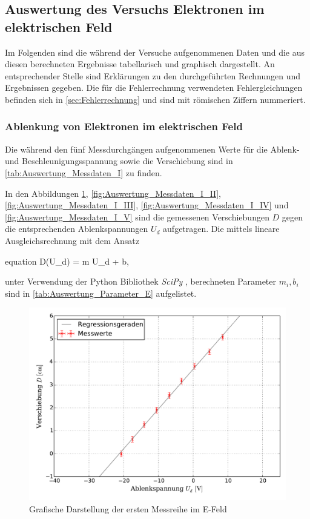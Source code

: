 \subsection{Auswertung des Versuchs Elektronen im elektrischen Feld}
	
	Im Folgenden sind die während der Versuche aufgenommenen Daten
	und die aus diesen berechneten Ergebnisse tabellarisch und graphisch
	dargestellt. An entsprechender Stelle sind Erklärungen zu den 
	durchgeführten Rechnungen und Ergebnissen gegeben.
	Die für die Fehlerrechnung verwendeten Fehlergleichungen befinden 
	sich in \cref{sec:Fehlerrechnung} und sind mit römischen Ziffern nummeriert.

	\subsubsection{Ablenkung von Elektronen im elektrischen Feld}
	
		Die während den fünf Messdurchgängen aufgenommenen Werte für die
		Ablenk- und Beschleunigungsspannung sowie die Verschiebung sind in \cref{tab:Auswertung_Messdaten_I} zu finden.
				
			   
		
		In den Abbildungen \ref{fig:Auswertung_Messdaten_I_I}, \ref{fig:Auswertung_Messdaten_I_II},
		\ref{fig:Auswertung_Messdaten_I_III}, \ref{fig:Auswertung_Messdaten_I_IV} und
		\ref{fig:Auswertung_Messdaten_I_V} sind die 
		gemessenen Verschiebungen $D$ gegen die entsprechenden Ablenkspannungen $U_{d}$ aufgetragen.
		Die mittels lineare Ausgleichsrechnung mit dem Ansatz 
		\begin{empheq}{equation}
			D(U_{d}) = m \cdot U_{d} + b,
		\end{empheq} 
		unter Verwendung der Python Bibliothek \emph{SciPy} \cite{SciPy},
		berechneten Parameter $m_{i}, b_{i}$ sind in \cref{tab:Auswertung_Parameter_E} aufgelistet.
		
		
		
		
		\begin{figure}[!h]
				\includegraphics[scale=0.7]{Grafiken/EFeld_Messreihe_I.pdf}
				\caption{Grafische Darstellung der ersten Messreihe im E-Feld}\label{fig:Auswertung_Messdaten_I_I}
		\end{figure}
		
